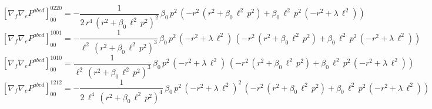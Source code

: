 \documentclass[11pt]{article}
\begin{document}
\begin{dmath*}[breakdepth={5}]
\left[\nabla_f\nabla_e P^{abcd}\right]_{00}^{0220} = -\frac{1}{2\,{r}^{4}\,{\left({r}^{2} + \beta_{0}\,{\ell}^{2}\,{p}^{2}\right)}^{2}}\,\beta_{0}\,{p}^{2}\,\left(-{r}^{2}\,\left({r}^{2} + \beta_{0}\,{\ell}^{2}\,{p}^{2}\right) + \beta_{0}\,{\ell}^{2}\,{p}^{2}\,\left(-{r}^{2} + \lambda\,{\ell}^{2}\right)\right)
\end{dmath*}
\begin{dmath*}[breakdepth={5}]
\left[\nabla_f\nabla_e P^{abcd}\right]_{00}^{1001} = -\frac{1}{{\ell}^{2}\,{\left({r}^{2} + \beta_{0}\,{\ell}^{2}\,{p}^{2}\right)}^{3}}\,\beta_{0}\,{p}^{2}\,\left(-{r}^{2} + \lambda\,{\ell}^{2}\right)\,\left(-{r}^{2}\,\left({r}^{2} + \beta_{0}\,{\ell}^{2}\,{p}^{2}\right) + \beta_{0}\,{\ell}^{2}\,{p}^{2}\,\left(-{r}^{2} + \lambda\,{\ell}^{2}\right)\right)
\end{dmath*}
\begin{dmath*}[breakdepth={5}]
\left[\nabla_f\nabla_e P^{abcd}\right]_{00}^{1010} = \frac{1}{{\ell}^{2}\,{\left({r}^{2} + \beta_{0}\,{\ell}^{2}\,{p}^{2}\right)}^{3}}\,\beta_{0}\,{p}^{2}\,\left(-{r}^{2} + \lambda\,{\ell}^{2}\right)\,\left(-{r}^{2}\,\left({r}^{2} + \beta_{0}\,{\ell}^{2}\,{p}^{2}\right) + \beta_{0}\,{\ell}^{2}\,{p}^{2}\,\left(-{r}^{2} + \lambda\,{\ell}^{2}\right)\right)
\end{dmath*}
\begin{dmath*}[breakdepth={5}]
\left[\nabla_f\nabla_e P^{abcd}\right]_{00}^{1212} = -\frac{1}{2\,{\ell}^{4}\,{\left({r}^{2} + \beta_{0}\,{\ell}^{2}\,{p}^{2}\right)}^{4}}\,\beta_{0}\,{p}^{2}\,{\left(-{r}^{2} + \lambda\,{\ell}^{2}\right)}^{2}\,\left(-{r}^{2}\,\left({r}^{2} + \beta_{0}\,{\ell}^{2}\,{p}^{2}\right) + \beta_{0}\,{\ell}^{2}\,{p}^{2}\,\left(-{r}^{2} + \lambda\,{\ell}^{2}\right)\right)
\end{dmath*}
\end{document}
